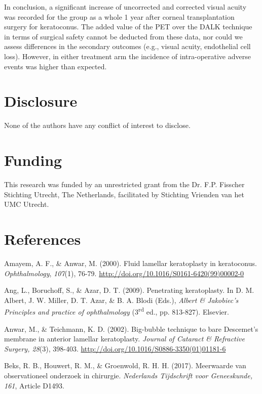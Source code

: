 \documentclass[authordate, empirical,issue]{jote-new-article}
\begin{document}
	In conclusion, a significant increase of uncorrected and corrected visual acuity was recorded for the group as a whole 1 year after corneal transplantation surgery for keratoconus. The added value of the PET over the DALK technique in terms of surgical safety cannot be deducted from these data, nor could we assess differences in the secondary outcomes (e.g., visual acuity, endothelial cell loss). However, in either treatment arm the incidence of intra-operative adverse events was higher than expected.



	\section{Disclosure}
	None of the authors have any conflict of interest to disclose.

	\section{Funding}
	This research was funded by an unrestricted grant from the Dr. F.P. Fisscher Stichting Utrecht, The Netherlands, facilitated by Stichting Vrienden van het UMC Utrecht.



	\section{References }



	Amayem, A. F., \& Anwar, M. (2000). Fluid lamellar keratoplasty in keratoconus. \emph{Ophthalmology}, \emph{107}(1), 76-79. \url{http://doi.org/10.1016/S0161-6420(99)00002-0}



	Ang, L., Boruchoff, S., \& Azar, D. T. (2009). Penetrating keratoplasty. In D. M. Albert, J. W. Miller, D. T. Azar, \& B. A. Blodi (Eds.), \emph{Albert \& Jakobiec's} \emph{Principles and practice of ophthalmology }(3\textsuperscript{rd} ed., pp. 813-827). Elsevier.



	Anwar, M., \& Teichmann, K. D. (2002). Big-bubble technique to bare Descemet's membrane in anterior lamellar keratoplasty. \emph{Journal of Cataract \& Refractive Surgery, 28}(3), 398-403. \url{http://doi.org/10.1016/S0886-3350(01)01181-6}



	Beks, R. B., Houwert, R. M., \& Groenwold, R. H. H. (2017). Meerwaarde van observationeel onderzoek in chirurgie. \emph{Nederlands Tijdschrift voor Geneeskunde, 161}, Article D1493.
\end{document}
